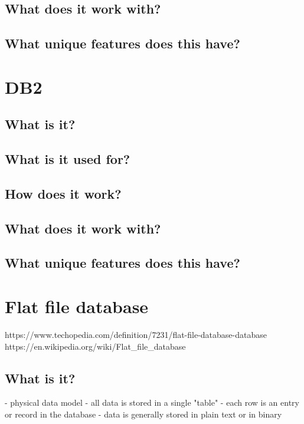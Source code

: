 \section{What does it work with?}

\section{What unique features does this have?}


\chapter{DB2}

\section{What is it?}

\section{What is it used for?}

\section{How does it work?}

\section{What does it work with?}

\section{What unique features does this have?}



\chapter{Flat file database}
https://www.techopedia.com/definition/7231/flat-file-database-database
https://en.wikipedia.org/wiki/Flat_file_database

\section{What is it?}
- physical data model
- all data is stored in a single "table"
- each row is an entry or record in the database
- data is generally stored in plain text or in binary


